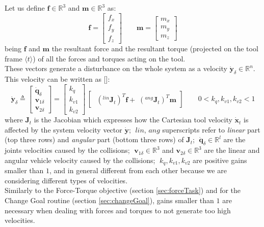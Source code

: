 \noindent Let us define $\boldsymbol{f} \in \mathbb{R}^3$ and $\boldsymbol{m} \in \mathbb{R}^3$ as:
\begin{equation}
\boldsymbol{f} = \begin{bmatrix}f_x \\ f_y \\ f_z\end{bmatrix} \qquad
\boldsymbol{m} = \begin{bmatrix}m_x \\ m_y \\ m_z\end{bmatrix}
\end{equation}
being $\boldsymbol{f}$ and $\boldsymbol{m}$ the resultant force and the resultant torque (projected on the tool frame $ \langle t \rangle $) of all the forces and torques acting on the tool. \\
These vectors generate a disturbance on the whole system as a velocity $ \dot{\boldsymbol{y}}_{\delta} \in \mathbb{R}^n$. This velocity can be written as [\cite{bookSiciliano}]:
\begin{equation}
	\label{eq:forTor}
	\dot{\boldsymbol{y}}_{\delta} \triangleq 
	\begin{bmatrix} \dot{\boldsymbol{q}}_{\delta} \\ \boldsymbol{v}_{1 \delta} \\ \boldsymbol{v}_{2 \delta} \end{bmatrix}
	= \begin{bmatrix} k_q \\ k_{v1} \\ k_{v2} \end{bmatrix} \, \begin{bmatrix}\;(^{lin}\boldsymbol{J}_t)^T \boldsymbol{f} + \;(^{ang}\boldsymbol{J}_t)^T \boldsymbol{m}\end{bmatrix} 
	\qquad 0 < k_q, k_{v1}, k_{v2} < 1 
\end{equation}
where $\boldsymbol{J}_t$ is the Jacobian which expresses how the Cartesian tool velocity $\dot{\boldsymbol{x}}_t$ is affected by the system velocity vector  $\dot{\boldsymbol{y}}$; $\;lin$, $ang$ superscripts refer to \textit{linear} part (top three rows) and \textit{angular} part (bottom three rows) of $\boldsymbol{J}_t$; $\;\dot{\boldsymbol{q}}_{\delta} \in \mathbb{R}^l$ are the joints velocities caused by the collisions; $\;\boldsymbol{v}_{1\delta} \in \mathbb{R}^3$ and $\boldsymbol{v}_{2\delta} \in \mathbb{R}^3$  are the linear and angular vehicle velocity caused by the collisions; $\;k_q, k_{v1}, k_{v2}$ are positive gains smaller than $1$, and in general different from each other  because we are considering different types of velocities.\\
Similarly to the Force-Torque objective (section \ref{sec:forceTask}) and for the Change Goal routine (section \ref{sec:changeGoal}), gains smaller than $1$ are necessary when dealing with forces and torques to not generate too high velocities.


